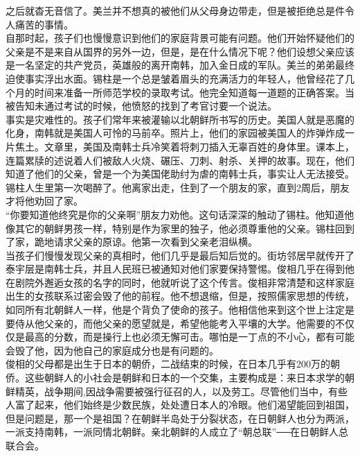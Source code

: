 之后就杳无音信了。美兰并不想真的被他们从父母身边带走，但是被拒绝总是件令人痛苦的事情。\\

自那时起，孩子们也慢慢意识到他们的家庭背景可能有问题。他们开始怀疑他们的父亲是不是来自从国界的另外一边，但是，是在什么情况下呢？他们设想父亲应该是一名坚定的共产党员，英雄般的离开南韩，加入金日成的军队。美兰的弟弟最终迫使事实浮出水面。锡柱是一个总是皱着眉头的充满活力的年轻人，他曾经花了几个月的时间来准备一所师范学校的录取考试。他完全知道每一道题的正确答案。当被告知未通过考试的时候，他愤怒的找到了考官讨要一个说法。\\

事实是灾难性的。孩子们常年来被灌输以北朝鲜所书写的历史。美国人就是恶魔的化身，南韩就是美国人可怜的马前卒。照片上，他们的家园被美国人的炸弹炸成一片焦土。文章里，美国及南韩士兵冷笑着将刺刀插入无辜百姓的身体里。课本上，连篇累牍的述说着人们被敌人火烧、碾压、刀刺、射杀、关押的故事。现在，他们知道了他们的父亲，曾是一个为美国佬助纣为虐的南韩士兵，事实让人无法接受。锡柱人生里第一次喝醉了。他离家出走，住到了一个朋友的家，直到2周后，朋友才将他劝回了家。\\

“你要知道他终究是你的父亲啊”朋友力劝他。这句话深深的触动了锡柱。他知道他像其它的朝鲜男孩一样，特别是作为家里的独子，他必须尊重他的父亲。锡柱回到了家，跪地请求父亲的原谅。他第一次看到父亲老泪纵横。\\

当孩子们慢慢发现父亲的真相时，他们几乎是最后知后觉的。街坊邻居早就传开了泰宇层是南韩士兵，并且人民班已被通知对他们家要保持警惕。俊相几乎在得到他在剧院外邂逅女孩的名字的同时，他就听说了这个传言。俊相非常清楚和这样家庭出生的女孩联系过密会毁了他的前程。他不想退缩，但是，按照儒家思想的传统，如同所有北朝鲜人一样，他是个背负了使命的孩子。他相信他来到这个世上注定是要侍从他父亲的，而他父亲的愿望就是，希望他能考入平壤的大学。他需要的不仅仅是最高的分数，而是操行上也必须无懈可击。哪怕是一丁点的不小心，都有可能会毁了他，因为他自己的家庭成分也是有问题的。\\

俊相的父母都是出生于日本的朝侨，二战结束的时候，在日本几乎有200万的朝侨。这些朝鲜人的小社会是朝鲜和日本的一个交集，主要构成是：来日本求学的朝鲜精英，战争期间,因战争需要被强行征召的人，以及劳工。尽管他们当中，有些人富了起来，他们始终是少数民族，处处遭日本人的冷眼。他们渴望能回到祖国，但是问题是，那一个是祖国？在朝鲜半岛处于分裂状态，在日朝鲜人也分为两派，一派支持南韩，一派同情北朝鲜。亲北朝鲜的人成立了“朝总联”──在日朝鲜人总联合会。\\

